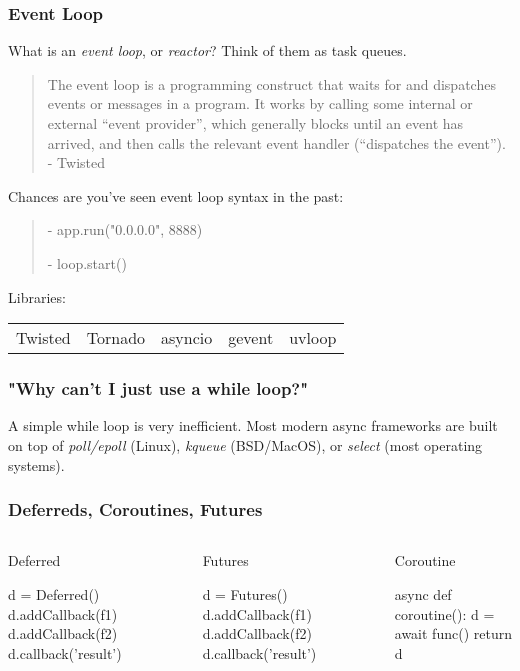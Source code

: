 \documentclass{beamer}
\begin{document}
\begin{frame}
\frametitle{Event Loop}
What is an \textit{event loop}, or \textit{reactor}? Think of them as task queues.

\begin{quote}
    The event loop is a programming construct that waits for and dispatches events or messages in a program. It works by calling some internal or external “event provider”, which generally blocks until an event has arrived, and then calls the relevant event handler (“dispatches the event”). - Twisted
\end{quote}

Chances are you've seen event loop syntax in the past:
\begin{quote}
    \begin{semiverbatim}
    - app.run("0.0.0.0", 8888)

    - loop.start()
    \end{semiverbatim}
\end{quote}

Libraries:

\begin{tabular}{l l l l l}
    Twisted & Tornado & asyncio & gevent & uvloop
\end{tabular}

\end{frame}


\begin{frame}
\frametitle{"Why can't I just use a while loop?"}
A simple while loop is very inefficient. Most modern async frameworks are built on top of \textit{poll/epoll} (Linux), \textit{kqueue} (BSD/MacOS), or \textit{select} (most operating systems).
\end{frame}


\begin{frame}
\frametitle{Deferreds, Coroutines, Futures}
\begin{columns}
    \begin{column}{0.45\textwidth}
        Deferred
        \begin{semiverbatim}
            d = Deferred()
            d.addCallback(f1)
            d.addCallback(f2)
            d.callback('result')
        \end{semiverbatim}
    \end{column}
    \begin{column}{0.35\textwidth}
        Futures
        \begin{semiverbatim}
            d = Futures()
            d.addCallback(f1)
            d.addCallback(f2)
            d.callback('result')
        \end{semiverbatim}
    \end{column}
    \begin{column}{0.5\textwidth}
        Coroutine
        \begin{semiverbatim}
            async def coroutine():
                d = await func()
                return d
        \end{semiverbatim}
    \end{column}
\end{columns}
\end{frame}
\end{document}
